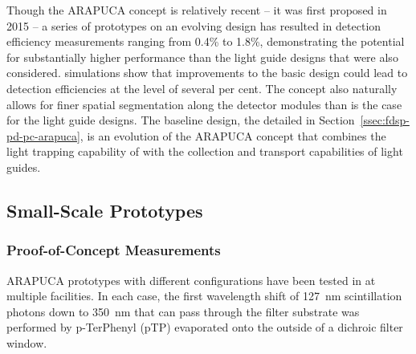 Though the ARAPUCA concept is relatively recent -- it was first proposed in 2015 -- 
a series of prototypes on an evolving design has resulted in detection efficiency measurements ranging from  \num{0.4}\% to \num{1.8}\%, demonstrating the potential for substantially higher performance than the light guide designs that were also considered.  simulations show that %
improvements to the basic design could lead to detection efficiencies at the level of several per cent. 
The concept also naturally allows for finer spatial segmentation along the detector modules than is the case for the light guide designs. 
The baseline design, the  detailed in Section~\ref{ssec:fdsp-pd-pc-arapuca}, is an evolution of the ARAPUCA concept that combines the light trapping capability of  with the collection and transport capabilities of light guides. 

\subsection{Small-Scale  Prototypes}


\subsubsection{Proof-of-Concept Measurements}
\label{sec:proof-principle}

ARAPUCA prototypes with different configurations have been tested in \lar at multiple facilities. In each case, the first wavelength shift of \SI{127}{nm} scintillation photons down to \SI{350}{nm} that can pass through the filter substrate was performed by p-TerPhenyl (pTP) evaporated onto the outside of a dichroic filter window. 

